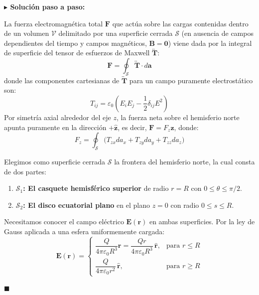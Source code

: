 \documentclass[11pt,a4paper]{book}
\newenvironment{solucion}{%
    \par\medskip\noindent\textbf{\color{blue!65!black}\Large $\blacktriangleright$ Solución paso a paso:}\par\medskip
}{%
    \hfill$\blacksquare$\par\bigskip
}
\newcommand{\rhat}{\hat{\bm{r}}}
\newcommand{\zhat}{\hat{\bm{z}}}
\newcommand{\Evec}{\bm{E}}
\newcommand{\Bvec}{\bm{B}}
\begin{document}
\begin{solucion}
La fuerza electromagnética total $\bm{F}$ que actúa sobre las cargas contenidas dentro de un volumen $\mathcal{V}$ delimitado por una superficie cerrada $\mathcal{S}$ (en ausencia de campos dependientes del tiempo y campos magnéticos, $\Bvec = \bm{0}$) viene dada por la integral de superficie del tensor de esfuerzos de Maxwell $\overleftrightarrow{\bm{T}}$:
\begin{equation}
    \bm{F} = \oint_{\mathcal{S}} \overleftrightarrow{\bm{T}} \cdot d\bm{a}
\end{equation}
donde las componentes cartesianas de $\overleftrightarrow{\bm{T}}$ para un campo puramente electrostático son:
\begin{equation}
    T_{ij} = \varepsilon_0 \left( E_i E_j - \frac{1}{2}\delta_{ij} E^2 \right)
\end{equation}
Por simetría axial alrededor del eje $z$, la fuerza neta sobre el hemisferio norte apunta puramente en la dirección $+\zhat$, es decir, $\bm{F} = F_z \zhat$, donde:
\begin{equation}
    F_z = \oint_{\mathcal{S}} \big( T_{zx} da_x + T_{zy} da_y + T_{zz} da_z \big)
\end{equation}

Elegimos como superficie cerrada $\mathcal{S}$ la frontera del hemisferio norte, la cual consta de dos partes:
\begin{enumerate}
    \item \textbf{$\mathcal{S}_1$: El casquete hemisférico superior} de radio $r = R$ con $0 \le \theta \le \pi/2$.
    \item \textbf{$\mathcal{S}_2$: El disco ecuatorial plano} en el plano $z = 0$ con radio $0 \le s \le R$.
\end{enumerate}
Necesitamos conocer el campo eléctrico $\Evec(\bm{r})$ en ambas superficies. Por la ley de Gauss aplicada a una esfera uniformemente cargada:
\begin{equation}
    \Evec(\bm{r}) = \begin{cases}
        \dfrac{Q}{4\pi\varepsilon_0 R^3} \bm{r} = \dfrac{Q r}{4\pi\varepsilon_0 R^3}\,\rhat, & \text{para } r \le R \\[10pt]
        \dfrac{Q}{4\pi\varepsilon_0 r^2}\,\rhat, & \text{para } r \ge R
    \end{cases}
\end{equation}


\end{solucion}
\end{document}
